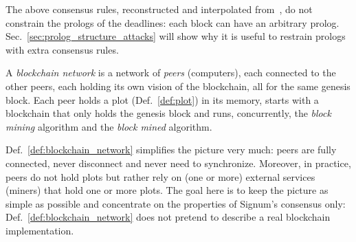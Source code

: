 %
The above consensus rules, reconstructed and interpolated
from~\cite{SignumPlotting,SignumSource},
do not constrain the prologs of the deadlines:
each block can have an arbitrary prolog. Sec.~\ref{sec:prolog_structure_attacks}
will show why it is useful to restrain prologs with extra consensus rules.
%
\begin{definition}\label{def:blockchain_network}
  A \emph{blockchain network} is a
  network of \emph{peers} (computers), each connected to the other peers,
  each holding its own vision of the blockchain, all for the same genesis block.
  Each peer holds a plot (Def.~\ref{def:plot}) in its memory, starts with
  a blockchain that only holds the genesis block and runs,
  concurrently, the \emph{block mining} algorithm
  and the \emph{block mined} algorithm.
\end{definition}
%
Def.~\ref{def:blockchain_network} simplifies the picture very much:
peers are fully connected, never disconnect and never need to synchronize.
Moreover, in practice, peers do not hold plots but rather rely on (one or more)
external services (miners) that hold one or more plots.
The goal here is to keep the picture as simple as possible and concentrate on the properties of
Signum's consensus only: Def.~\ref{def:blockchain_network} does not pretend
to describe a real blockchain implementation.

